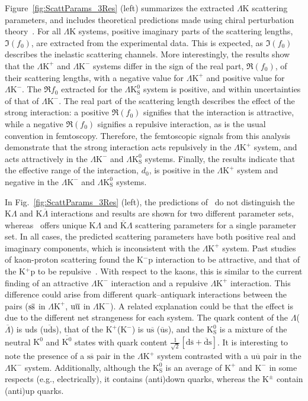 \documentclass[ALICE,manyauthors]{cernphprep}
\newcommand{\Lam}{$\Lambda$\xspace}
\newcommand{\ALam}{$\overline{\Lambda}$\xspace}
\newcommand{\KchP}{$\mathrm{K^{+}}$\xspace}
\newcommand{\KchM}{$\mathrm{K^{-}}$\xspace}
\newcommand{\Kpm}{$\mathrm{K^{\pm}}$\xspace}
\newcommand{\Ks}{$\mathrm{K^{0}_{S}}$\xspace}
\newcommand{\LamK}{$\Lambda$K\xspace}
\newcommand{\LamKchP}{$\Lambda\mathrm{K^{+}}$\xspace}
\newcommand{\LamKchM}{$\Lambda\mathrm{K^{-}}$\xspace}
\newcommand{\LamKs}{$\Lambda\mathrm{K^{0}_{S}}$\xspace}
\begin{document}
Figure~\ref{fig:ScattParams_3Res} (left) summarizes the extracted \LamK scattering parameters, and includes theoretical predictions made using chiral perturbation theory~\cite{Liu:2006xja,Mai:2009ce}.
For all \LamK systems, positive imaginary parts of the scattering lengths, $\Im(f_{0})$, are extracted from the experimental data. 
This is expected, as $\Im(f_{0})$ describes the inelastic scattering channels.
More interestingly, the results show that the \LamKchP and \LamKchM systems differ in the sign of the real part, $\Re(f_{0})$, of their scattering lengths, with a negative value for \LamKchP and positive value for \LamKchM.
The $\Re f_{0}$ extracted for the \LamKs system is positive, and within uncertainties of that of \LamKchM. 
The real part of the scattering length describes the effect of the strong interaction: a positive $\Re(f_{0})$ signifies that the interaction is attractive, while a negative $\Re(f_{0})$ signifies a repulsive interaction, as is the usual convention in femtoscopy.
Therefore, the femtoscopic signals from this analysis demonstrate that the strong interaction acts repulsively in the \LamKchP system, and acts attractively in the \LamKchM and \LamKs systems.
Finally, the results indicate that the effective range of the interaction, $d_{0}$, is positive in the \LamKchP system and negative in the \LamKchM and \LamKs systems.

In Fig.~\ref{fig:ScattParams_3Res} (left), the predictions of~\cite{Liu:2006xja} do not distinguish the K\Lam and K\ALam interactions and results are shown for two different parameter sets, whereas~\cite{Mai:2009ce} offers unique K\Lam and $\overline{\mathrm{K}}$\Lam scattering parameters for a single parameter set. 
In all cases, the predicted scattering parameters have both positive real and imaginary components, which is inconsistent with the \LamKchP system.
Past studies of kaon-proton scattering found the K$^{-}$p interaction to be attractive, and that of the K$^{+}$p to be repulsive~\cite{Humphrey:1962zz, Hadjimichef:2002xe, Ikeda:2012au}.
With respect to the kaons, this is similar to the current finding of an attractive \LamKchM interaction and a repulsive \LamKchP interaction.
This difference could arise from different quark--antiquark interactions between the pairs ($\rm s\overline{s}$ in \LamKchP, $\rm u\overline{u}$ in \LamKchM).
A related explanation could be that the effect is due to the different net strangeness for each system.
The quark content of the \Lam (\ALam) is uds ($\overline{\mathrm{uds}}$), that of the \KchP (\KchM) is u$\overline{\mathrm{s}}$ ($\overline{\mathrm{u}}$s), and the \Ks is a mixture of the neutral $\mathrm{K}^{0}$ and $\overline{\mathrm{K}^{0}}$ states with quark content $\frac{1}{\sqrt{2}}\left[\mathrm{d\overline{s} + \overline{d}s}\right]$.
It is interesting to note the presence of a $\mathrm{s\overline{s}}$ pair in the \LamKchP system contrasted with a $\mathrm{u\overline{u}}$ pair in the \LamKchM system.
Additionally, although the \Ks is an average of \KchP and \KchM in some respects (e.g., electrically), it contains (anti)down quarks, whereas the \Kpm contain (anti)up quarks.
\end{document}
